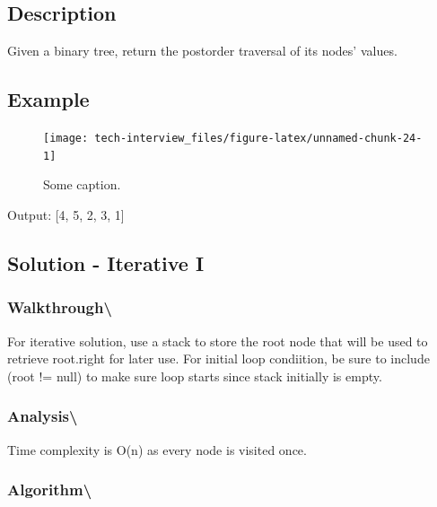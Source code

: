 \documentclass[]{book}
\begin{document}
\label{sec:depth_first_postorder}

\hypertarget{description-64}{%
\subsection{Description}\label{description-64}}

Given a binary tree, return the postorder traversal of its nodes' values.

\hypertarget{example-61}{%
\subsection{Example}\label{example-61}}

\begin{figure}
\texttt{[image: tech-interview\_files/figure-latex/unnamed-chunk-24-1]} \caption{Some caption.}\label{fig:unnamed-chunk-24}
\end{figure}

Output: {[}4, 5, 2, 3, 1{]}

\hypertarget{solution---iterative-i-2}{%
\subsection{Solution - Iterative I}\label{solution---iterative-i-2}}

\hypertarget{walkthrough-71}{%
\subsubsection{Walkthrough\textbackslash{}}\label{walkthrough-71}}

For iterative solution, use a stack to store the root node that will be used to retrieve root.right for later use. For
initial loop condiition, be sure to include (root != null) to make sure loop starts since stack initially is empty.

\hypertarget{analysis-78}{%
\subsubsection{Analysis\textbackslash{}}\label{analysis-78}}

Time complexity is O(n) as every node is visited once.

\hypertarget{algorithm-79}{%
\subsubsection{Algorithm\textbackslash{}}\label{algorithm-79}}
\end{document}
